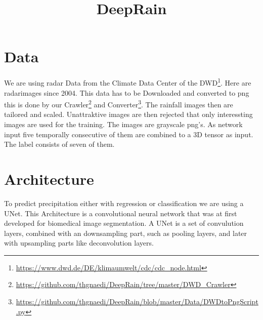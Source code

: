 \documentclass[oneside]{htwg-report}
\begin{document}



\newcommand{\verfasserA}{Thomas Gnädig}
\newcommand{\verfasserB}{Etienne Gramlich}
\newcommand{\verfasserC}{Merle Wolff}
\newcommand{\verfasserD}{Tim Hardenacke}
\newcommand{\verfasserE}{}
\newcommand{\thema}{DeepRain}
\newcommand{\hoschschule}{Hochschule für Technik, Wirtschaft und Gestaltung}
\newcommand{\institut}{HTWG Konstanz, Institut für Optische Systeme}
\newcommand{\prueferA}{Oliver Dürr}
\newcommand{\prueferB}{}


\title[Teamprojektthema]{\thema}


\makecover[]


\twocolumn
\section*{Data}
We are using radar Data from the Climate Data Center of the DWD\footnote{\url{https://www.dwd.de/DE/klimaumwelt/cdc/cdc_node.html}}. Here are radarimages since 2004. 
This data has to be Downloaded and converted to png this is done by our Crawler\footnote{\url{https://github.com/thgnaedi/DeepRain/tree/master/DWD_Crawler}} and Converter\footnote{\url{https://github.com/thgnaedi/DeepRain/blob/master/Data/DWDtoPngScript.py}}.
The rainfall images then are tailored and scaled. Unattraktive images are then rejected that only interessting images are used for the training.
The images are grayscale png's. As network input five temporally consecutive of them are combined to a 3D tensor as input. The label consists of seven of them.

\section*{Architecture}
To predict precipitation either with regression or classification we are using a UNet.
This Architecture is a convolutional neural network that was at first developed for biomedical image segmentation.
A UNet is a set of convulution layers, combined with an downsampling part, such as pooling layers, and later with upsampling parts like deconvolution layers.
\end{document}
